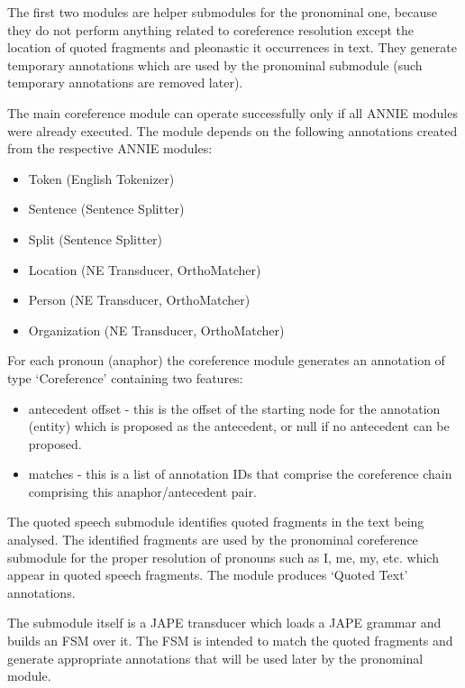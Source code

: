 The first two modules are helper submodules for the pronominal one,
because they do not perform anything related to coreference resolution
except the location of quoted fragments and pleonastic it occurrences
in text.  They generate temporary annotations which are used by the
pronominal submodule (such temporary annotations are removed later).

The main coreference module can operate successfully only if all ANNIE
modules were already executed. The module depends on the following
annotations created from the respective ANNIE modules:

\begin{itemize}
\item Token (English Tokenizer)
\item Sentence (Sentence Splitter)
\item Split (Sentence Splitter)
\item Location (NE Transducer, OrthoMatcher)
\item Person (NE Transducer, OrthoMatcher)
\item Organization (NE Transducer, OrthoMatcher)
\end{itemize}

For each pronoun (anaphor) the coreference module generates an
annotation of type `Coreference' containing two features:

\begin{itemize}

\item antecedent offset - this is the offset of the starting node for
the annotation (entity) which is proposed as the antecedent, or null if no
antecedent can be proposed.

\item matches - this is a list of annotation IDs
that comprise the coreference chain comprising this anaphor/antecedent
pair.

\end{itemize}





The quoted speech submodule identifies quoted fragments in the text
being analysed. The identified fragments are used by the pronominal
coreference submodule for the proper resolution of pronouns such as I,
me, my, etc. which appear in quoted speech fragments.  The module
produces `Quoted Text' annotations.

The submodule itself is a JAPE transducer which loads a JAPE grammar
and builds an FSM over it. The FSM is intended to match the quoted
fragments and generate appropriate annotations that will be used later
by the pronominal module.

